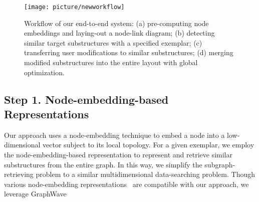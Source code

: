 \begin{figure}[!tp] %
    \centering
    \setlength{\belowcaptionskip}{-5pt}
    \texttt{[image: picture/newworkflow]}
    \caption{
    Workflow of our end-to-end system:
    (a) pre-computing node embeddings and laying-out
    a node-link diagram; (b) detecting similar target substructures with a specified exemplar; (c) transferring user modifications to similar substructures; (d) merging modified substructures into the entire layout with global optimization.}
    \label{fig:workflow}
\end{figure}




\subsection{Step 1. Node-embedding-based Representations}
Our approach uses a node-embedding technique to embed a node into a low-dimensional vector subject to its local topology. For a given exemplar, we employ the node-embedding-based representation to represent and retrieve similar substructures from the entire graph. In this way, we simplify the subgraph-retrieving problem to a similar multidimensional data-searching problem. 
Though various node-embedding representations~\cite{DBLP:conf/kdd/DonnatZHL18, DBLP:conf/kdd/GroverL16, DBLP:conf/cikm/HeimannSSK18, DBLP:journals/cn/MarcusS12, 10.1145/3097983.3098061} 
are compatible with our approach,
we leverage GraphWave~\cite{DBLP:conf/kdd/DonnatZHL18}  

